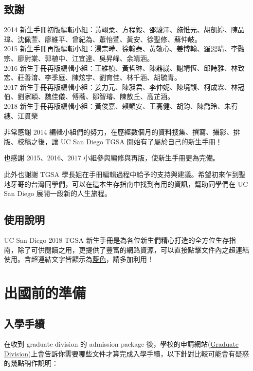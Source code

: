 \documentclass[10pt,a4paper]{book}
\begin{document}
\begin{CJK}{UTF8}{bkai}
{\begin{center}
\begin{tabular}{l l p{4cm} l}
\hline
\end{tabular}
\end{center}
}
\newpage
\section*{致謝}

2014 新生手冊初版編輯小組：黃翊柔、方程毅、邵駿澤、施惟元、胡凱婷、陳品瑋、沈佩萱、廖維平、曾紀為、蕭怡萱、黃安、徐聖修、蘇仲岐。\\
2015 新生手冊再版編輯小組：湯宗曄、徐翰泰、黃敬心、姜博翰、羅恩晴、李融宗、廖尉棠、郭植中、江宜達、吳昇峰、余靖涵。\\
2016 新生手冊再版編輯小組：王維楨、黃哲琳、陳鼎崴、謝靖恆、邱詩雅、林致宏、莊善淯、李季庭、陳炫宇、劉育佳、林千涵、胡毓青。\\
2017 新生手冊再版編輯小組：姜力元、陳昶君、李仲妮、陳境馥、柯成霖、林冠伯、劉家穎、魏佳儀、傅蕎、鄒智璿、陳敖丘、高芷涵。\\
2018 新生手冊再版編輯小組：黃俊嘉、賴顗安、王高健、胡鈞、陳喬玲、朱宥繐、江貫榮

非常感謝 2014 編輯小組們的努力，在歷經數個月的資料搜集、撰寫、攝影、排版、校稿之後，讓 UC San Diego TGSA 開始有了屬於自己的新生手冊！

也感謝 2015、2016、2017 小組參與編修與再版，使新生手冊更為完備。

此外也謝謝 TGSA 學長姐在手冊編輯過程中給予的支持與建議。希望初來乍到聖地牙哥的台灣同學們，可以在這本生存指南中找到有用的資訊，幫助同學們在 UC San Diego 展開一段新的人生旅程。

\section*{使用說明}

UC San Diego 2018 TGSA 新生手冊是為各位新生們精心打造的全方位生存指南，除了可供閱讀之用，更提供了豐富的網路資源，可以直接點擊文件內之超連結使用。含超連結文字皆顯示為\href{http://ucsdtgsa.blogspot.com}{藍色}，請多加利用！ 

\tableofcontents
\mainmatter

\chapter{出國前的準備}
\section{入學手續}
在收到 graduate division 的 admission package 後，學校的申請網站(\href{http://grad.ucsd.edu/admissions/admitted/index.html}{Graduate Division})上會告訴你需要哪些文件才算完成入學手續，以下針對比較可能會有疑惑的幾點稍作說明：


\end{CJK}
\end{document}
